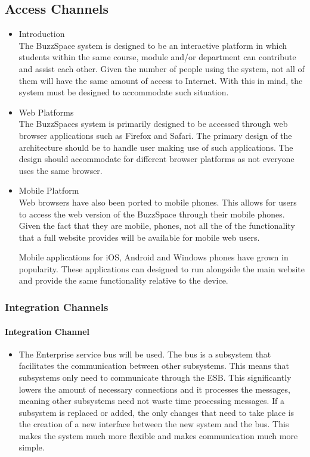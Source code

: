 \documentclass[10pt]{article}
\begin{document}
\subsection{Access Channels}
\begin{itemize}
\item Introduction \\ \hfill
The BuzzSpace system is designed to be an interactive platform in which students within the same course, module and/or department can contribute and assist each other. Given the number of people using the system, not all of them will have the same amount of access to Internet. With this in mind, the system must be designed to accommodate such situation.

\item Web Platforms \\ \hfill
The BuzzSpaces system is primarily designed to be accessed through web browser applications such as Firefox and Safari. The primary design of the architecture should be to handle user making use of such applications. The design should accommodate for different browser platforms as not everyone uses the same browser.


\item Mobile Platform \\ \hfill
Web browsers have also been ported to mobile phones. This allows for users to access the web version of the BuzzSpace through their mobile phones. Given the fact that they are mobile, phones, not all the of the functionality that a full website provides will be available for mobile web users.

Mobile applications for iOS, Android and Windows phones have grown in popularity. These applications can designed to run alongside the main website and provide the same functionality relative to the device. 
\end{itemize}



\subsubsection{Integration Channels}
\paragraph{Integration Channel}
\begin{itemize}
\item The Enterprise service bus will be used. The bus is a subsystem that facilitates the communication between other subsystems. This means that subsystems only need to communicate through the ESB. This significantly lowers the amount of necessary connections and it processes the messages, meaning other subsystems need not waste time processing messages. If a subsystem is replaced or added, the only changes that need to take place is the creation of a new interface between the new system and the bus. This makes the system much more flexible  and makes communication much more simple.
\end{itemize}
\end{document}
